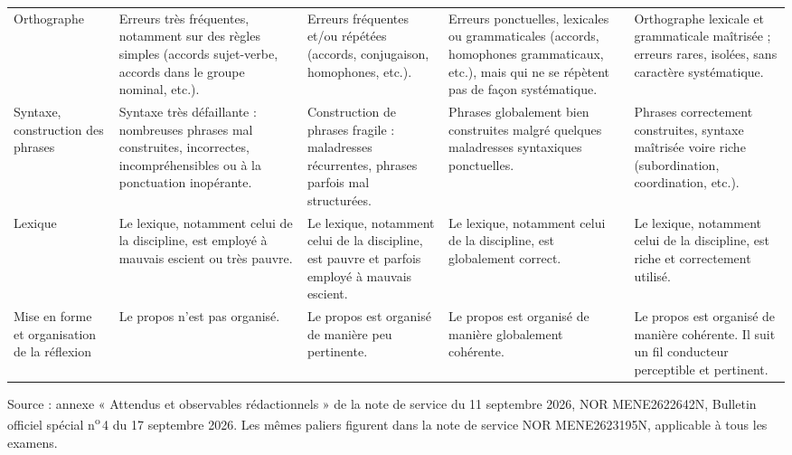 {\fontsize{9.4}{12.2}\selectfont\renewcommand{\arraystretch}{1.5}%
\begin{tabularx}{\linewidth}{@{}>{\leavevmode\color{otNavy}\otSemi\fontsize{8.6}{11}\selectfont\raggedright\arraybackslash}p{24mm}YYYY@{}}
\toprule
 &  &  &  &  \\
\midrule
Orthographe & Erreurs très fréquentes, notamment sur des règles simples (accords sujet-verbe, accords dans le groupe nominal, etc.).
  & Erreurs fréquentes et/ou répétées (accords, conjugaison, homophones, etc.).
  & Erreurs ponctuelles, lexicales ou grammaticales (accords, homophones grammaticaux, etc.), mais qui ne se répètent pas de façon
    systématique.
  & Orthographe lexicale et grammaticale maîtrisée ; erreurs rares, isolées, sans caractère systématique. \\
\midrule
Syntaxe, construction des phrases & Syntaxe très défaillante : nombreuses phrases mal construites, incorrectes, incompréhensibles
    ou à la ponctuation inopérante.
  & Construction de phrases fragile : maladresses récurrentes, phrases parfois mal structurées.
  & Phrases globalement bien construites malgré quelques maladresses syntaxiques ponctuelles.
  & Phrases correctement construites, syntaxe maîtrisée voire riche (subordination, coordination, etc.). \\
\midrule
Lexique & Le lexique, notamment celui de la discipline, est employé à mauvais escient ou très pauvre.
  & Le lexique, notamment celui de la discipline, est pauvre et parfois employé à mauvais escient.
  & Le lexique, notamment celui de la discipline, est globalement correct.
  & Le lexique, notamment celui de la discipline, est riche et correctement utilisé. \\
\midrule
Mise en forme et organisation de la réflexion & Le propos n'est pas organisé.
  & Le propos est organisé de manière peu pertinente.
  & Le propos est organisé de manière globalement cohérente.
  & Le propos est organisé de manière cohérente. Il suit un fil conducteur perceptible et pertinent. \\
\bottomrule
\end{tabularx}}
\par\vspace{3mm}
{\fontsize{8}{10.5}\selectfont\color{otMuted}Source : annexe « Attendus et observables rédactionnels » de la note de service du
11 septembre 2026, NOR MENE2622642N, Bulletin officiel spécial n\textsuperscript{o}\,4 du 17 septembre 2026. Les mêmes paliers
figurent dans la note de service NOR MENE2623195N, applicable à tous les examens.\par}

\clearpage
